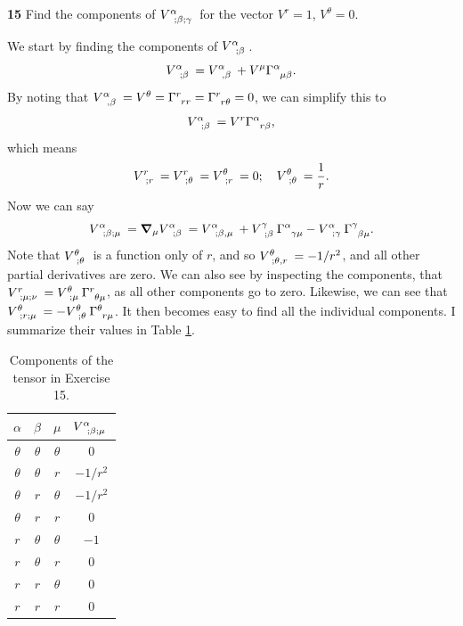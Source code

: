 \documentclass[gr-notes.tex]{subfiles}
\begin{document}
\textbf{15}
Find the components of $\tensor{V}{^\alpha_{;\beta;\gamma}}$ for the vector $V^r = 1$, $V^\theta = 0$.

We start by finding the components of $\tensor{V}{^\alpha_{;\beta}}$.
%
\begin{displaymath}
  \tensor{V}{^\alpha_{;\beta}} =
  \tensor{V}{^\alpha_{,\beta}} +
  V^\mu \tensor{\Gamma}{^\alpha_{\mu\beta}}.
\end{displaymath}
%
By noting that $\tensor{V}{^\alpha_{,\beta}} = V^\theta = \tensor{\Gamma}{^r_{rr}} = \tensor{\Gamma}{^r_{r\theta}} = 0$, we can simplify this to
%
\begin{displaymath}
  \tensor{V}{^\alpha_{;\beta}} =
  V^r \tensor{\Gamma}{^\alpha_{r\beta}},
\end{displaymath}
%
which means
%
\begin{displaymath}
  \tensor{V}{^r_{;r}} = \tensor{V}{^r_{;\theta}} = \tensor{V}{^\theta_{;r}} = 0;
  \quad
  \tensor{V}{^\theta_{;\theta}} = \frac{1}{r}.
\end{displaymath}
%
Now we can say
%
\begin{displaymath}
  \tensor{V}{^\alpha_{;\beta;\mu}} =
  \grad_\mu \tensor{V}{^\alpha_{;\beta}} =
  \tensor{V}{^\alpha_{;\beta,\mu}} +
  \tensor{V}{^\gamma_{;\beta}} \tensor{\Gamma}{^\alpha_{\gamma\mu}} -
  \tensor{V}{^\alpha_{;\gamma}} \tensor{\Gamma}{^\gamma_{\beta\mu}}.
\end{displaymath}
%
Note that $\tensor{V}{^\theta_{;\theta}}$ is a function only of $r$, and so $\tensor{V}{^\theta_{;\theta,r}} = -1/r^2$, and all other partial derivatives are zero. We can also see by inspecting the components, that $\tensor{V}{^r_{;\mu;\nu}} = \tensor{V}{^\theta_{;\mu}} \tensor{\Gamma}{^r_{\theta\mu}}$, as all other components go to zero. Likewise, we can see that $\tensor{V}{^\theta_{;r;\mu}} = -\tensor{V}{^\theta_{;\theta}} \tensor{\Gamma}{^\theta_{r\mu}}$. It then becomes easy to find all the individual components. I summarize their values in Table \ref{tab:ch5-ex15}.

\begin{table}[b]
  \centering
  \begin{tabular}{ccc|c}
    $\alpha$ &  $\beta$ &    $\mu$ & $\tensor{V}{^\alpha_{;\beta;\mu}}$ \\
    \hline
    $\theta$ & $\theta$ & $\theta$ & $0$      \\
    $\theta$ & $\theta$ &      $r$ & $-1/r^2$ \\
    $\theta$ &      $r$ & $\theta$ & $-1/r^2$ \\
    $\theta$ &      $r$ &      $r$ & $0$      \\
         $r$ & $\theta$ & $\theta$ & $-1$     \\
         $r$ & $\theta$ &      $r$ & $0$      \\
         $r$ &      $r$ & $\theta$ & $0$      \\
         $r$ &      $r$ &      $r$ & $0$      \\
  \end{tabular}
  \caption{Components of the tensor in Exercise 15.}
  \label{tab:ch5-ex15}
\end{table}
\end{document}
